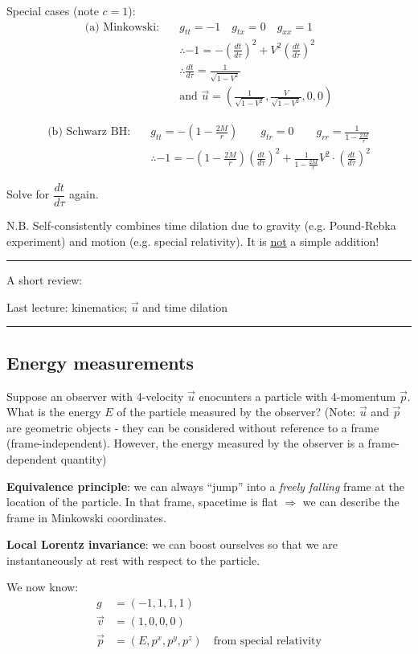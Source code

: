 \documentclass[a4paper]{article} %
\newcommand{\review}[1]
{
\hrule
A short review:

#1
\hrule
}
\begin{document}
Special cases (note $c=1$):
\begin{align*}
\text{(a) Minkowski:}\quad& g_{tt}=-1\quad g_{tx}=0\quad g_{xx}=1\\
&\therefore -1=-\left(\frac{dt}{d\tau}\right)^2+V^2\left(\frac{dt}{d\tau}\right)^2\\
&\therefore \frac{dt}{d\tau}=\frac{1}{\sqrt{1-V^2}}\\
&\text{and }\vec{u}=\left(\frac{1}{\sqrt{1-V^2}},\frac{V}{\sqrt{1-V^2}},0,0\right)
\end{align*}

\begin{align*}
\text{(b) Schwarz BH:}\quad &g_{tt}=-\left(1-\frac{2M}{r}\right)\qquad g_{tr}=0\qquad g_{rr}=\frac{1}{1-\frac{2M}{r}}\\
&\therefore -1= -\left(1-\frac{2M}{r}\right)\left(\frac{dt}{d\tau}\right)^2+\frac{1}{1-\frac{2M}{r}}V^2 \cdot\left(\frac{dt}{d\tau}\right)^2
\end{align*}

Solve for $\dfrac{dt}{d\tau}$ again.

N.B. Self-consistently combines time dilation due to gravity (e.g. Pound-Rebka experiment) and motion (e.g. special relativity). It is \underline{not} a simple addition!


\review{Last lecture: kinematics; $\vec{u}$ and time dilation}


\subsection{Energy measurements}

Suppose an observer with 4-velocity $\vec{u}$ enocunters a particle with 4-momentum $\vec{p}$. What is the energy $E$ of the particle measured by the observer? (Note: $\vec{u}$ and $\vec{p}$ are geometric objects - they can be considered without reference to a frame (frame-independent). However, the energy measured by the observer is a frame-dependent quantity)

\textbf{Equivalence principle}: we can always ``jump'' into a \emph{freely falling} frame at the location of the particle. In that frame, spacetime is flat $\Rightarrow$ we can describe the frame in Minkowski coordinates. 

\textbf{Local Lorentz invariance}: we can boost ourselves so that we are instantaneously at rest with respect to the particle.

We now know:
\begin{align*}
g&=(-1,1,1,1)\\
\vec{v}&=(1,0,0,0)\\
\vec{p}&=(E,p^x,p^y,p^z)\quad \text{from special relativity}
\end{align*}
\end{document}
